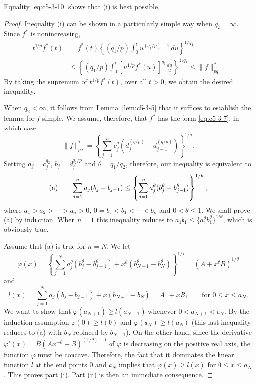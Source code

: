 Equality \eqref{eq:c5-3-10} shows that (i) is best possible.

\begin{proof}
Inequality (i) can be shown in a particularly simple way when $q_{2} = \infty$.
Since $f^{*}$ is nonincreasing,
\begin{align*}
t^{1/p}f^{*}(t)&=f^{*}(t)\left\{(q_{1}/p)\int_{0}^{t}u^{(q_{1}/p)-1}\,du\right\}^{1/q_{1}}\\
&\leq\left\{(q_{1}/p)\int_{0}^{t}[u^{1/p}f^{*}(u)]^{q_{1}}\frac{du}{u}\right\}^{1/q_{1}}
\leq\|f\|_{pq_{1}}^{*}.
\end{align*}
By taking the supremum of $t^{1/p}f^{*}(t)$, over all $t > 0$, we obtain the
desired inequality.

When $q_{2} < \infty$, it follows from Lemma~\ref{lem:c5-3-5} that it suffices
to establish the lemma for $f$ simple. We assume, therefore, that $f^{*}$ has
the form \eqref{eq:c5-3-7}, in which case
\[
\|f\|_{pq}^{*}=\left\{\sum_{j=1}^{n}c_{j}^{q}(d_{j}^{(q/p)}-d_{j-1}^{(q/p)})\right\}^{1/q}.
\]
Setting $a_{j} = c_{j}^{q_{2}}$, $b_{j} = d_{j}^{q_{2}/p}$ and
$\theta = q_{1}/q_{2}$, therefore, our inequality is equivalent to
\[
\textup{(a)}\qquad
\sum_{j=1}^{n}a_{j}(b_{j}-b_{j-1})\leq
\left\{\sum_{j=1}^{n}a_{j}^{\theta}(b_{j}^{\theta}-b_{j-1}^{\theta})\right\}^{1/\theta},
\]
where $a_{1} > a_{2} > \cdots > a_{n} > 0$, $0 = b_{0} < b_{1} < \cdots < b_{n}$
and $0 < \theta \leq 1$. We shall prove (a) by induction. When $n = 1$ this
inequality reduces to $a_{1}b_{1} \leq \{a_{1}^{\theta}b_{1}^{\theta}\}^{1/\theta}$,
which is obviously true.

Assume that (a) is true for $n = N$. We let
\[
\varphi(x)=\left\{\sum_{j=1}^{N}a_{j}^{\theta}(b_{j}^{\theta}-b_{j-1}^{\theta})
+x^{\theta}(b_{N+1}^{\theta}-b_{N}^{\theta})\right\}^{1/\theta}
=(A+x^{\theta}B)^{1/\theta}
\]
and
\[
l(x)=\sum_{j=1}^{N}a_{j}(b_{j}-b_{j-1})+x(b_{N+1}-b_{N})=A_{1}+xB_{1}
\qquad\text{for } 0 \leq x \leq a_{N}.
\]
We want to show that $\varphi(a_{N+1}) \geq l(a_{N+1})$ whenever
$0 < a_{N+1} < a_{N}$. By the induction assumption $\varphi(0) \geq l(0)$ and
$\varphi(a_{N}) \geq l(a_{N})$ (this last inequality reduces to (a) with $b_{N}$
replaced by $b_{N+1}$). On the other hand, since the derivative
$\varphi'(x) = B(Ax^{-\theta} + B)^{(1/\theta)-1}$ of $\varphi$ is decreasing on
the positive real axis, the function $\varphi$ must be concave. Therefore, the
fact that it dominates the linear function $l$ at the end points 0 and $a_{N}$
implies that $\varphi(x) \geq l(x)$ for $0 \leq x \leq a_{N}$. This proves part
(i). Part (ii) is then an immediate consequence.


\end{proof}
